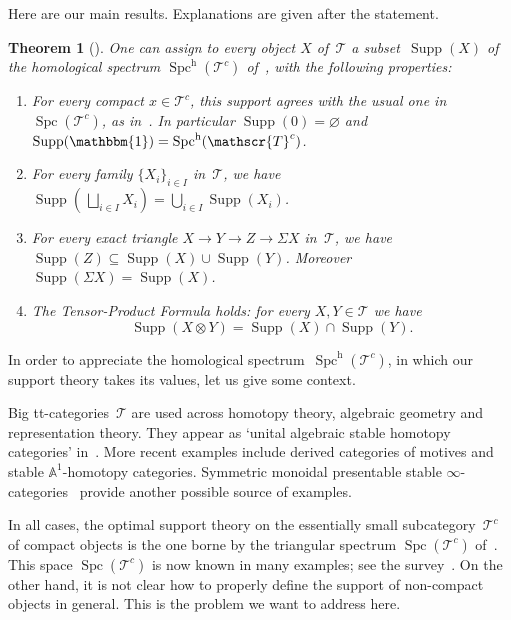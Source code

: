 \documentclass[JEP,XML,SOM,Unicode]{cedram}
\newenvironment{enumeratea}
{\bgroup\def\theenumi{\alph{enumi}}\begin{enumerate}}
{\end{enumerate}\egroup}
\numberwithin{equation}{section}
\newtheorem{Thm}[equation]{Theorem}
\theoremstyle{definition}
\DeclareMathOperator{\Spc}{Spc}
\newcommand{\cat}[1]{\mathscr{#1}}
\newcommand{\unit}{\mathbbm{1}}
\newcommand{\smallh}{\mathrm{h}}
\DeclareMathOperator{\Supp}{Supp}
\newcommand{\cT}{\cat{T}}
\newcommand{\SpchT}{\Spch(\cat{T}^c)}
\newcommand{\Spch}{\Spc^{\smallh}}
\newcommand{\SpcT}{\Spc(\cat{T}^c)}
\begin{document}
Here are our main results. Explanations are given after the statement.
\begin{Thm}[{}]
\label{Thm:support-intro}
One can assign to every object $X$ of~$\cT$ a subset~$\Supp(X)$ of the homological spectrum $\SpchT$ of~\cite{Balmer20a}, with the following properties:
\begin{enumeratea}

\item
\label{it:support-agree}
For every compact $x\in \cT^c$, this support agrees with the usual one in~$\SpcT$, as in~\cite{Balmer05a}. In particular $\Supp(0)=\varnothing$ and $\Supp(\unit)=\SpchT$.

\item
\label{it:support-coprod}
For every family $\{X_i\}_{i\in I}$ in~$\cT$, we have $\Supp(\,\bigsqcup_{i\in I}X_i)=\bigcup_{i\in I}\Supp(X_i)$.

\item
\label{it:support-triangle}
For every exact triangle $X\to Y\to Z\to \Sigma X$ in~$\cT$, we have $\Supp(Z)\subseteq\Supp(X)\cup \Supp(Y)$. Moreover $\Supp(\Sigma X)=\Supp(X)$.

\item
\label{it:support-TPF}
The Tensor-Product Formula holds: for every $X,Y\in\cT$ we have
\begin{equation*}
\Supp(X\otimes Y)=\Supp(X)\cap \Supp(Y).
\end{equation*}
\end{enumeratea}
\end{Thm}

In order to appreciate the homological spectrum~$\SpchT$, in which our support theory takes its values, let us give some context.

Big tt-categories~$\cT$ are used across homotopy theory, algebraic geometry and representation theory. They appear as `unital algebraic stable homotopy categories' in~\cite{HoveyPalmieriStrickland97}. More recent examples include derived categories of motives and stable $\mathbb{A}^{\!1}$-homotopy categories. Symmetric monoidal presentable stable $\infty$-categories~\cite{LurieHA} provide another possible source of examples.

In all cases, the optimal support theory on the essentially small subcategory~$\cT^c$ of compact objects is the one borne by the triangular spectrum $\SpcT$ of~\cite{Balmer05a}. This space $\SpcT$ is now known in many examples; see the survey~\cite{Balmer19}. On the other hand, it is not clear how to properly define the support of non-compact objects in general. This is the problem we want to address here.
\end{document}
